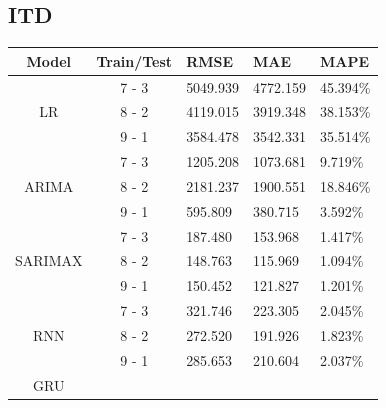 \documentclass{ieeeojies}
\begin{document}
\subsection{ITD}
\begin{table}[H]
    \renewcommand{\arraystretch}{1.5}
    \centering
    \begin{tabular}{|c|c|p{1cm}|p{1cm}|p{1cm}|}
        \hline
        \textbf{Model} & \textbf{Train/Test} & \textbf{RMSE} & \textbf{MAE} & \textbf{MAPE} \\
        \hline
        \multirow{3}{*}{LR}
                       & 7 - 3               & 5049.939      & 4772.159     & 45.394\%      \\
        \cline{2-5}
                       & 8 - 2               & 4119.015      & 3919.348     & 38.153\%      \\
        \cline{2-5}
                       & 9 - 1               & 3584.478      & 3542.331     & 35.514\%      \\
        \hline
        \multirow{3}{*}{ARIMA}
                       & 7 - 3               & 1205.208      & 1073.681     & 9.719\%       \\
        \cline{2-5}
                       & 8 - 2               & 2181.237      & 1900.551     & 18.846\%      \\
        \cline{2-5}
                       & 9 - 1               & 595.809       & 380.715      & 3.592\%       \\
        \hline
        \multirow{3}{*}{SARIMAX}
                       & 7 - 3               & 187.480       & 153.968      & 1.417\%       \\
        \cline{2-5}
                       & 8 - 2               & 148.763       & 115.969      & 1.094\%       \\
        \cline{2-5}
                       & 9 - 1               & 150.452       & 121.827      & 1.201\%       \\
        \hline
        \multirow{3}{*}{RNN}
                       & 7 - 3               & 321.746       & 223.305      & 2.045\%       \\
        \cline{2-5}
                       & 8 - 2               & 272.520       & 191.926      & 1.823\%       \\
        \cline{2-5}
                       & 9 - 1               & 285.653       & 210.604      & 2.037\%       \\
        \hline
        \multirow{3}{*}{GRU}

\end{tabular}
\end{table}
\end{document}
